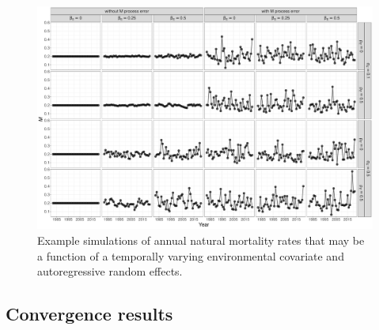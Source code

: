 \documentclass[
  12pt,
]{article}
\begin{document}
\begin{landscape}
\begin{figure}
\caption{Example simulations of annual natural mortality rates that may be a function of a temporally varying environmental covariate and autoregressive random effects.}\label{M_example}
\begin{center}
\includegraphics[height = \textheight]{M_example}
\end{center}
\end{figure}
\end{landscape}

\hypertarget{convergence-results}{%
\subsection*{Convergence results}\label{convergence-results}}
\end{document}
